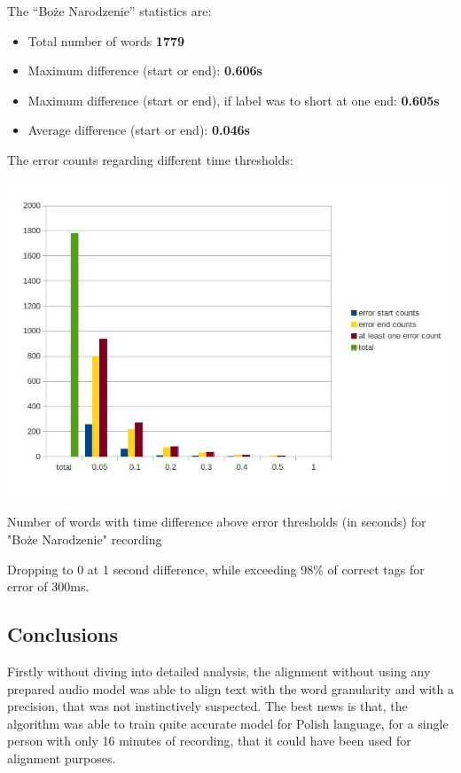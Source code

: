 \documentclass[12pt,a4paper,english]{article}
\begin{document}
\newpage
The “Boże Narodzenie” statistics are: \newline
\begin{itemize}
    \item Total number of words				\textbf{1779}
    \item Maximum difference (start or end): 			\textbf{0.606s}
    \item Maximum difference (start or end), if label was to short at one end: 			\textbf{0.605s}
    \item Average difference  (start or end):			\textbf{0.046s}
\end{itemize}
The error counts regarding different time thresholds:
\begin{center}
    \includegraphics[scale=0.6]{boze_narodzenie_length_based_counts.jpg}
    \caption[]{Number of words with time difference above error thresholds (in seconds) for "Boże Narodzenie" recording}
\end{center}
Dropping to 0 at 1 second difference, while exceeding 98\% of correct tags for error of 300ms.

\newpage
\subsection{Conclusions}

Firstly without diving into detailed analysis, the alignment without using any prepared audio model was able to align text with the word granularity and with a precision, that was not instinctively suspected. \newline
The best news is that, the algorithm was able to train quite accurate model for Polish language, for a single person with only 16 minutes of recording, that it could have been used for alignment purposes. \newline
\end{document}
